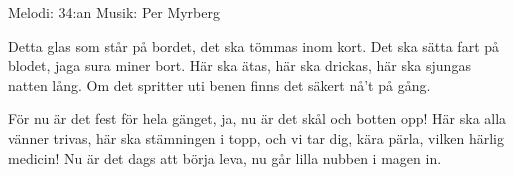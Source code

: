 \begin{song}

\begin{songmeta}
Melodi: 34:an
Musik: Per Myrberg
\end{songmeta}

\begin{songtext}
Detta glas som står på bordet,
det ska tömmas inom kort.
Det ska sätta fart på blodet,
jaga sura miner bort.
Här ska ätas, här ska drickas,
här ska sjungas natten lång.
Om det spritter uti benen
finns det säkert nå't på gång.

För nu är det fest för hela gänget,
ja, nu är det skål och botten opp!
Här ska alla vänner trivas,
här ska stämningen i topp,
och vi tar dig, kära pärla,
vilken härlig medicin!
Nu är det dags att börja leva,
nu går lilla nubben i magen in.
\end{songtext}
\end{song}
